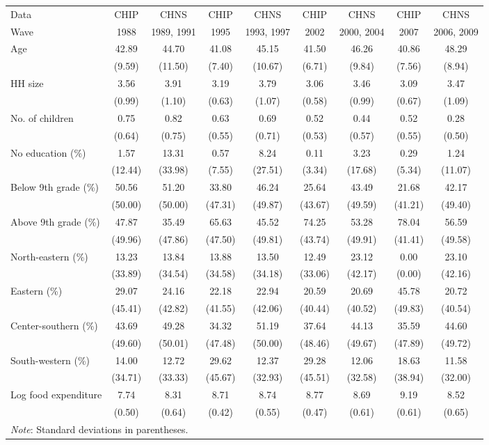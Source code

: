 \begin{tabular}{l|c c|c c|c c|c c}
\toprule
Data & CHIP & CHNS & CHIP & CHNS & CHIP & CHNS & CHIP & CHNS \\
Wave & 1988 & 1989, 1991 & 1995 & 1993, 1997 & 2002 & 2000, 2004 & 2007 & 2006, 2009 \\
\midrule
 Age & 42.89 & 44.70 & 41.08 & 45.15 & 41.50 & 46.26 & 40.86 & 48.29  \\
              & (9.59) & (11.50) & (7.40) & (10.67) & (6.71) & (9.84) & (7.56) & (8.94)  \\
 HH size & 3.56 & 3.91 & 3.19 & 3.79 & 3.06 & 3.46 & 3.09 & 3.47  \\
              & (0.99) & (1.10) & (0.63) & (1.07) & (0.58) & (0.99) & (0.67) & (1.09)  \\
 No. of children & 0.75 & 0.82 & 0.63 & 0.69 & 0.52 & 0.44 & 0.52 & 0.28  \\
              & (0.64) & (0.75) & (0.55) & (0.71) & (0.53) & (0.57) & (0.55) & (0.50)  \\
 No education (\%) & 1.57 & 13.31 & 0.57 & 8.24 & 0.11 & 3.23 & 0.29 & 1.24  \\
              & (12.44) & (33.98) & (7.55) & (27.51) & (3.34) & (17.68) & (5.34) & (11.07)  \\
 Below 9th grade (\%) & 50.56 & 51.20 & 33.80 & 46.24 & 25.64 & 43.49 & 21.68 & 42.17  \\
              & (50.00) & (50.00) & (47.31) & (49.87) & (43.67) & (49.59) & (41.21) & (49.40)  \\
 Above 9th grade (\%) & 47.87 & 35.49 & 65.63 & 45.52 & 74.25 & 53.28 & 78.04 & 56.59  \\
              & (49.96) & (47.86) & (47.50) & (49.81) & (43.74) & (49.91) & (41.41) & (49.58)  \\
 North-eastern (\%) & 13.23 & 13.84 & 13.88 & 13.50 & 12.49 & 23.12 & 0.00 & 23.10  \\
              & (33.89) & (34.54) & (34.58) & (34.18) & (33.06) & (42.17) & (0.00) & (42.16)  \\
 Eastern (\%) & 29.07 & 24.16 & 22.18 & 22.94 & 20.59 & 20.69 & 45.78 & 20.72  \\
              & (45.41) & (42.82) & (41.55) & (42.06) & (40.44) & (40.52) & (49.83) & (40.54)  \\
 Center-southern (\%) & 43.69 & 49.28 & 34.32 & 51.19 & 37.64 & 44.13 & 35.59 & 44.60  \\
              & (49.60) & (50.01) & (47.48) & (50.00) & (48.46) & (49.67) & (47.89) & (49.72)  \\
 South-western (\%) & 14.00 & 12.72 & 29.62 & 12.37 & 29.28 & 12.06 & 18.63 & 11.58  \\
              & (34.71) & (33.33) & (45.67) & (32.93) & (45.51) & (32.58) & (38.94) & (32.00)  \\
 Log food expenditure & 7.74 & 8.31 & 8.71 & 8.74 & 8.77 & 8.69 & 9.19 & 8.52  \\
              & (0.50) & (0.64) & (0.42) & (0.55) & (0.47) & (0.61) & (0.61) & (0.65)  \\
\bottomrule
\multicolumn{9}{p{5in}}{\footnotesize \textit{Note}: Standard deviations in parentheses.}
\end{tabular}